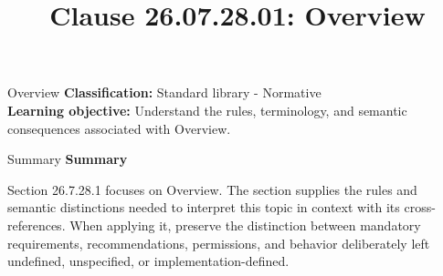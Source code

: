 \documentclass[10pt,letterpaper]{article}
\title{Clause 26.07.28.01: Overview}
\author{}
\date{}
\begin{document}
\maketitle
\begin{CornellOverviewBox}{Overview}
\textbf{Classification:} Standard library - Normative\\[2pt]
\textbf{Learning objective:} Understand the rules, terminology, and semantic consequences associated with Overview.
\end{CornellOverviewBox}\begin{CornellSummaryBox}{Summary}
{\sffamily\bfseries\color{Accent} Summary}\par\vspace{3pt}Section 26.7.28.1 focuses on Overview. The section supplies the rules and semantic distinctions needed to interpret this topic in context with its cross-references. When applying it, preserve the distinction between mandatory requirements, recommendations, permissions, and behavior deliberately left undefined, unspecified, or implementation-defined.
\end{CornellSummaryBox}
\end{document}
